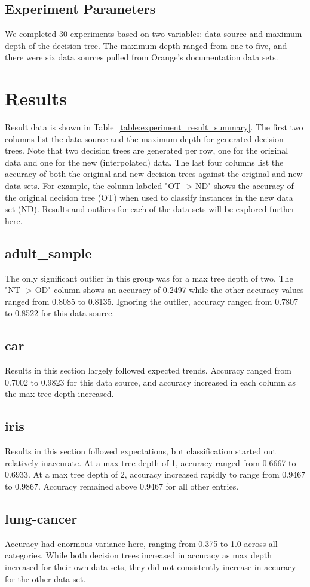\documentclass{sig-alternate}
\begin{document}
\subsection{Experiment Parameters}
We completed 30 experiments based on two variables: data source and maximum depth of the decision tree. The maximum depth ranged from one to five, and there were six data sources pulled from Orange's documentation data sets.

\section{Results}
Result data is shown in Table~\ref{table:experiment_result_summary}. The first two columns list the data source and the maximum depth for generated decision trees. Note that two decision trees are generated per row, one for the original data and one for the new (interpolated) data. The last four columns list the accuracy of both the original and new decision trees against the original and new data sets. For example, the column labeled "OT -> ND" shows the accuracy of the original decision tree (OT) when used to classify instances in the new data set (ND). Results and outliers for each of the data sets will be explored further here.
\subsection{adult\_sample}
The only significant outlier in this group was for a max tree depth of two. The "NT -> OD" column shows an accuracy of 0.2497 while the other accuracy values ranged from 0.8085 to 0.8135. Ignoring the outlier, accuracy ranged from 0.7807 to 0.8522 for this data source.
\subsection{car}
Results in this section largely followed expected trends. Accuracy ranged from 0.7002 to 0.9823 for this data source, and accuracy increased in each column as the max tree depth increased.
\subsection{iris}
Results in this section followed expectations, but classification started out relatively inaccurate. At a max tree depth of 1, accuracy ranged from 0.6667 to 0.6933. At a max tree depth of 2, accuracy increased rapidly to range from 0.9467 to 0.9867. Accuracy remained above 0.9467 for all other entries.
\subsection{lung-cancer}
Accuracy had enormous variance here, ranging from 0.375 to 1.0 across all categories. While both decision trees increased in accuracy as max depth increased for their own data sets, they did not consistently increase in accuracy for the other data set.
\end{document}
